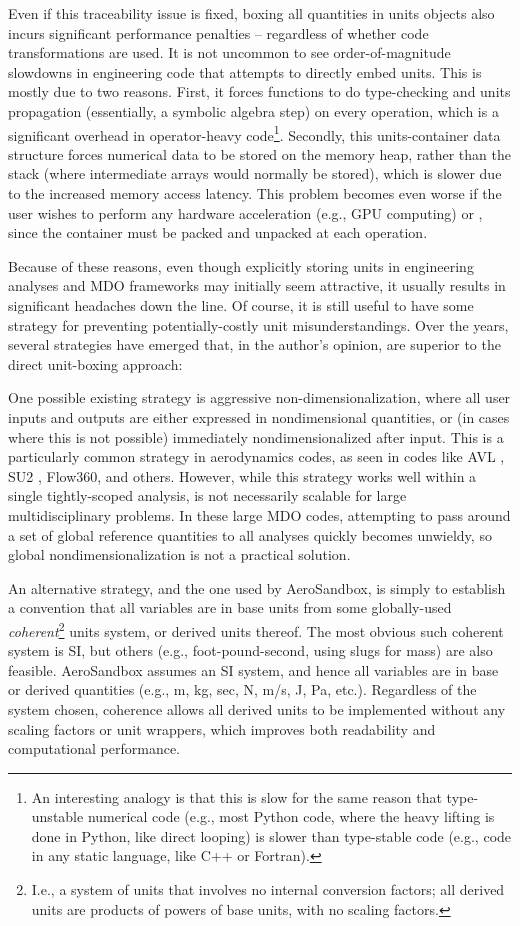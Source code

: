 Even if this traceability issue is fixed, boxing all quantities in units objects also incurs significant performance penalties -- regardless of whether code transformations are used. It is not uncommon to see order-of-magnitude slowdowns in engineering code that attempts to directly embed units. This is mostly due to two reasons. First, it forces functions to do type-checking and units propagation (essentially, a symbolic algebra step) on every operation, which is a significant overhead in operator-heavy code\footnote{An interesting analogy is that this is slow for the same reason that type-unstable numerical code (e.g., most Python code, where the heavy lifting is done in Python, like direct looping) is slower than type-stable code (e.g., code in any static language, like C++ or Fortran).}. Secondly, this units-container data structure forces numerical data to be stored on the memory heap, rather than the stack (where intermediate arrays would normally be stored), which is slower due to the increased memory access latency. This problem becomes even worse if the user wishes to perform any hardware acceleration (e.g., GPU computing) or , since the container must be packed and unpacked at each operation.

Because of these reasons, even though explicitly storing units in engineering analyses and MDO frameworks may initially seem attractive, it usually results in significant headaches down the line. Of course, it is still useful to have some strategy for preventing potentially-costly unit misunderstandings. Over the years, several strategies have emerged that, in the author's opinion, are superior to the direct unit-boxing approach:

 One possible existing strategy is aggressive non-dimensionalization, where all user inputs and outputs are either expressed in nondimensional quantities, or (in cases where this is not possible) immediately nondimensionalized after input. This is a particularly common strategy in aerodynamics codes, as seen in codes like AVL \cite{avl}, SU2 \cite{economon_su2_2016}, Flow360, and others. However, while this strategy works well within a single tightly-scoped analysis, is not necessarily scalable for large multidisciplinary problems. In these large MDO codes, attempting to pass around a set of global reference quantities to all analyses quickly becomes unwieldy, so global nondimensionalization is not a practical solution.

An alternative strategy, and the one used by AeroSandbox, is simply to establish a convention that all variables are in base units from some globally-used \emph{coherent}\footnote{I.e., a system of units that involves no internal conversion factors; all derived units are products of powers of base units, with no scaling factors.} units system, or derived units thereof. The most obvious such coherent system is SI, but others (e.g., foot-pound-second, using slugs for mass) are also feasible. AeroSandbox assumes an SI system, and hence all variables are in base or derived quantities (e.g., m, kg, sec, N, m/s, J, Pa, etc.). Regardless of the system chosen, coherence allows all derived units to be implemented without any scaling factors or unit wrappers, which improves both readability and computational performance.

